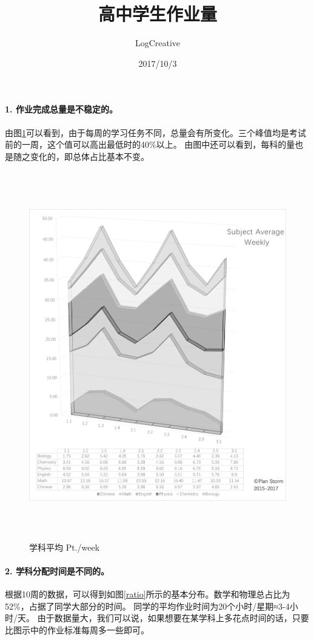 \documentclass[a4paper,12pt]{article}
\begin{document}
\begin{CJK}{UTF8}{song}
\title{高中学生作业量}
\author{LogCreative}
\date{2017/10/3}
\maketitle
\normalsize

\paragraph{1. 作业完成总量是不稳定的。} 由图\ref{avg}可以看到，由于每周的学习任务不同，总量会有所变化。三个峰值均是考试前的一周，这个值可以高出最低时的40\%以上。
由图中还可以看到，每科的量也是随之变化的，即总体占比基本不变。

\begin{figure}[H]
    \centering
    \includegraphics[height=16cm]{img/1.png}
    \caption{学科平均 Pt./week}
    \label{avg}
\end{figure}

\paragraph{2. 学科分配时间是不同的。} 根据10周的数据，可以得到如图\ref{ratio}所示的基本分布。数学和物理总占比为52\%，占据了同学大部分的时间。
同学的平均作业时间为20个小时/星期≈3-4小时/天。
由于数据量大，我们可以说，如果想要在某学科上多花点时间的话，只要比图示中的作业标准每周多一些即可。


\end{CJK}
\end{document}
